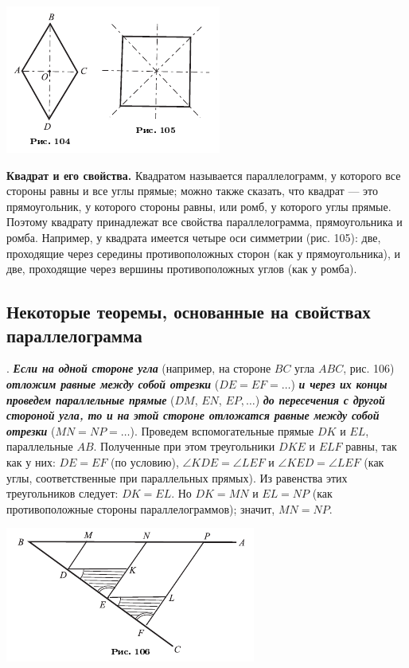 \documentclass[oneside]{book}
\begin{document}
\includegraphics{pics/ris-104-105}

\textbf{Квадрат и его свойства.}
Квадратом называется параллелограмм, у которого все стороны равны и все углы прямые;
можно также сказать, что квадрат — это прямоугольник, у которого стороны равны, или ромб, у которого углы прямые.
Поэтому квадрату принадлежат все свойства параллелограмма, прямоугольника и ромба.
Например, у квадрата имеется четыре оси симметрии (рис. 105):
две, проходящие через середины противоположных сторон (как у прямоугольника), и две, проходящие через вершины противоположных углов (как у ромба).

\subsection*{Некоторые теоремы, основанные на свойствах параллелограмма}

.
\textbf{\emph{Если на одной стороне угла}} (например, на стороне $BC$ угла $ABC$, рис. 106) \textbf{\emph{отложим равные между собой отрезки}} ($DE=EF=\dots$) \textbf{\emph{и через их концы проведем параллельные прямые}} ($DM$, $EN$, $EP,\dots$) \textbf{\emph{до пересечения с другой стороной угла, то и на этой стороне отложатся равные между собой отрезки}} ($MN=NP=\dots$).
Проведем вспомогательные прямые $DK$ и $EL$, параллельные $AB$.
Полученные при этом треугольники $DKE$ и $ELF$ равны, так как у них:
$DE=EF$ (по условию), $\angle KDE=\angle LEF$ и $\angle KED = \angle LEF$ (как углы, соответственные при параллельных прямых).
Из равенства этих треугольников следует:
$DK=EL$.
Но $DK=MN$ и $EL=NP$ (как противоположные стороны параллелограммов);
значит, $MN=NP$.

\includegraphics{pics/ris-106}
\end{document}

